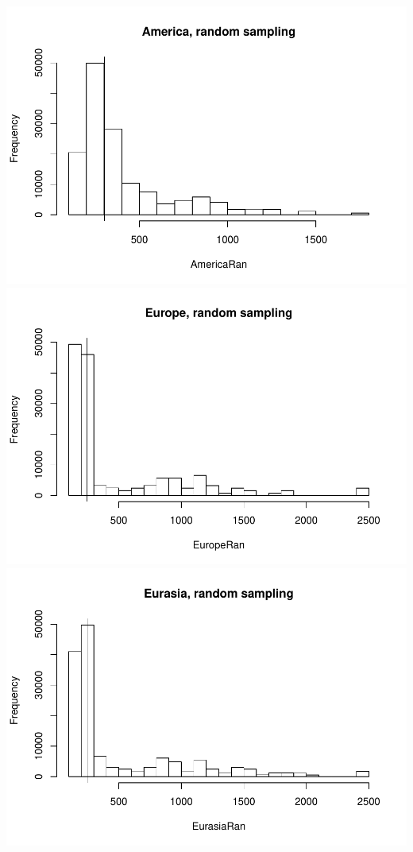 \documentclass[]{article}
\begin{document}
\includegraphics{MA_JJ_files/figure-latex/RSCon-1.pdf}
\includegraphics{MA_JJ_files/figure-latex/RSCon-2.pdf}
\includegraphics{MA_JJ_files/figure-latex/RSCon-3.pdf}
\end{document}
